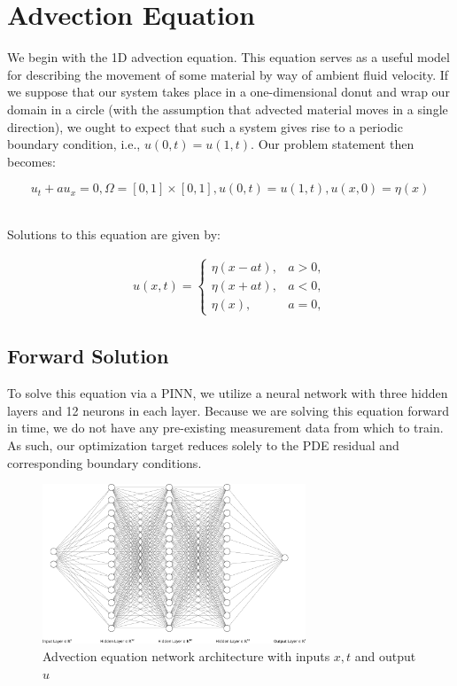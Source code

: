\documentclass[letterpaper,12pt]{article}
\begin{document}
    \section{Advection Equation}{\label{sec:advection-equation}}
    We begin with the 1D advection equation. This equation serves as a useful model for describing the movement of some
    material by way of ambient fluid velocity. If we suppose that our system takes place in a one-dimensional donut and
    wrap our domain in a circle (with the assumption that advected material moves in a single direction), we ought to
    expect that such a system gives rise to a periodic boundary condition, i.e., $u(0, t) = u(1, t)$. Our problem
    statement then becomes:

    $$
    u_t + a u_x = 0, \Omega = [0, 1] \times [0, 1], u(0, t) = u(1, t), u(x, 0) = \eta(x)
    $$


    \ \\
    Solutions to this equation are given by:

    \begin{align*}
    u(x, t) = \begin{cases}
        \eta(x - at), &a > 0, \\
        \eta(x + at), &a < 0, \\
        \eta(x), &a = 0,
    \end{cases}
    \end{align*}


    \subsection*{Forward Solution}{\label{sec:advection-equation-forwared}}
    To solve this equation via a PINN, we utilize a neural network with three hidden layers and 12 neurons in each 
    layer. Because we are solving this equation forward in time, we do not have any pre-existing measurement data from
    which to train. As such, our optimization target reduces solely to the PDE residual and corresponding boundary
    conditions.


    \begin{figure}[h]
        \centering
        \includegraphics[width=0.70\textwidth]{nn.png}
        \caption{Advection equation network architecture with inputs $x, t$ and output $u$}
    \end{figure}
\end{document}
